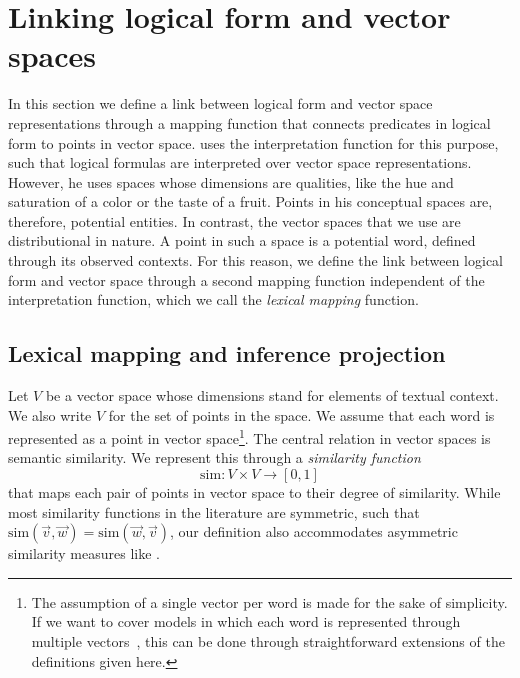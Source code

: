 \newcommand{\loglang}{\ensuremath{{\cal{L}}}\xspace}
\newcommand{\predsym}[1]{\ensuremath{{\cal{P}}_{#1}}\xspace}
\newcommand{\simfunc}{\ensuremath{\mathrm{sim}}}

\section{Linking logical form and vector spaces}
\label{sec:interface}

In this section we define a link between logical form and vector space
representations through a mapping function that connects predicates in logical
form to points in vector space. \citet{gardenfors:book2004} uses the
interpretation function for this purpose, such that logical formulas are
interpreted over vector space representations. However, he uses spaces whose
dimensions are qualities, like the hue and saturation of a color or the taste of
a fruit. Points in his conceptual spaces are, therefore, potential entities. In
contrast, the vector spaces that we use are distributional in nature. A point in
such a space is a potential word, defined through its observed contexts. For
this reason, we define the link between logical form and vector space through a
second mapping function independent of the interpretation function, which we
call the \emph{lexical mapping} function.

\subsection*{Lexical mapping and inference projection} 


Let $V$ be a vector space whose dimensions stand for elements of  textual
context. We also write $V$ for the set of points in the space. We assume that
each word is represented as a point in vector space\footnote{The assumption of a
single vector per word is made for the sake of simplicity. If we want to cover
models in which each word is represented through multiple
vectors~\citep{reisinger:naacl2010,dinu:emnlp2010}, this can be done through
straightforward extensions of the definitions given here.}.
The central relation in vector spaces is semantic similarity. We represent this
through a \textit{similarity function} \[\simfunc: V \times V \to [0,1] \] that
maps each pair of points in vector space to their degree of similarity. While
most similarity functions in the literature are symmetric, such that 
$\simfunc(\vec v, \vec w) = \simfunc(\vec w, \vec v)$, our definition also
accommodates asymmetric similarity measures like \citet{kotlerman:nlej2010}.

